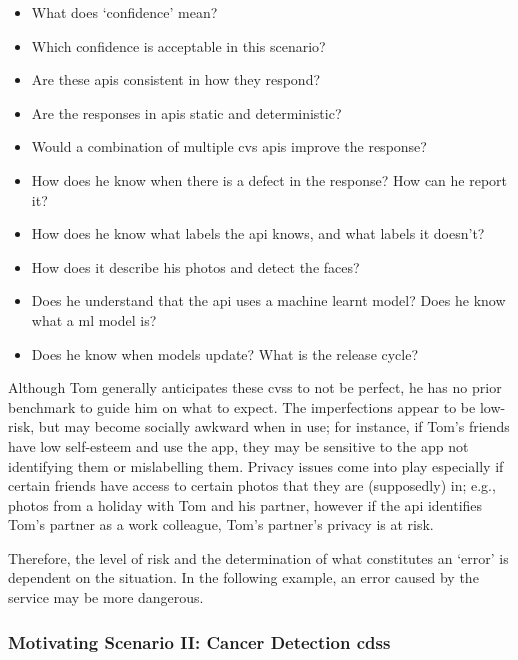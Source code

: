 \begin{itemize}
  \item What does `confidence' mean?%
  \item Which confidence is acceptable in this scenario?%
  \item Are these \glspl{api} consistent in how they respond?%
  \item Are the responses in \glspl{api} static and deterministic?%
  \item Would a combination of multiple \gls{cvs} \glspl{api} improve the response?%
  \item How does he know when there is a defect in the response? How can he report it?%
  \item How does he know what labels the \gls{api} knows, and what labels it doesn't?%
  \item How does it describe his photos and detect the faces?%
  \item Does he understand that the \gls{api} uses a machine learnt model? Does he know what a \gls{ml} model is?%
  \item Does he know when models update? What is the release cycle?%
\end{itemize}

Although Tom generally anticipates these \glspl{cvs} to not be perfect, he has no prior benchmark to guide him on what to expect. The imperfections appear to be low-risk, but may become socially awkward when in use; for instance, if Tom's friends have low self-esteem and use the app, they may be sensitive to the app not identifying them or mislabelling them. Privacy issues come into play especially if certain friends have access to certain photos that they are (supposedly) in; e.g., photos from a holiday with Tom and his partner, however if the \gls{api} identifies Tom's partner as a work colleague, Tom's partner's privacy is at risk.

Therefore, the level of risk and the determination of what constitutes an `error' is dependent on the situation. In the following example, an error caused by the service may be more dangerous.


\subsubsection{Motivating Scenario II: Cancer Detection \gls{cdss}}
\label{ssec:introduction:motivation:scenario:cancer}

